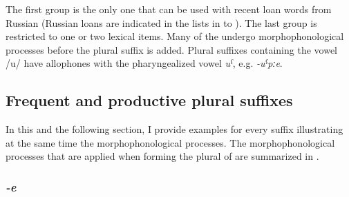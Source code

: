 The first group is the only one that can be used with recent loan words from Russian (Russian loans are indicated in the lists in  to ). The last group is restricted to one or two lexical items. Many of the  undergo morphophonological processes before the plural suffix is added. Plural suffixes containing the vowel /u/ have allophones with the pharyngealized vowel \textit{uˁ}, e.g. \textit{-uˁpːe}.



\subsection{Frequent and productive plural suffixes}
\label{sec:FrequentAndProductivePluralSuffixes}
In this and the following section, I provide examples for every suffix illustrating at the same time the morphophonological processes. The morphophonological processes that are applied when forming the plural of  are summarized in .


\subsubsection*{\textit{-e}}



